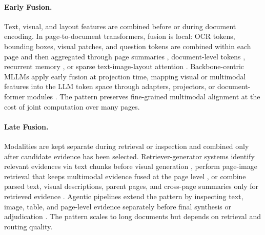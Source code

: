 \documentclass[11pt]{article}
\begin{document}
\paragraph{Early Fusion.}
Text, visual, and layout features are combined before or during document encoding. In page-to-document transformers, fusion is local: OCR tokens, bounding boxes, visual patches, and question tokens are combined within each page and then aggregated through page summaries \cite{tito2023hierarchical}, document-level tokens \cite{blau2024gram}, recurrent memory \cite{dong2024multi}, or sparse text-image-layout attention \cite{borchmann2025arctic}. Backbone-centric MLLMs apply early fusion at projection time, mapping visual or multimodal features into the LLM token space through adapters, projectors, or document-former modules \cite{tanaka2024instructdoc, duan2025docopilot, jia2024leopard}. The pattern preserves fine-grained multimodal alignment at the cost of joint computation over many pages.

\paragraph{Late Fusion.}
Modalities are kept separate during retrieval or inspection and combined only after candidate evidence has been selected. Retriever-generator systems identify relevant evidences via text chunks before visual generation \cite{zhang2024cream}, perform page-image retrieval that keeps multimodal evidence fused at the page level \cite{cho2024m3docrag}, or combine parsed text, visual descriptions, parent pages, and cross-page summaries only for retrieved evidence \cite{gong2025mhier}. Agentic pipelines extend the pattern by inspecting text, image, table, and page-level evidence separately before final synthesis or adjudication \cite{han2025mdocagent, duan2025m2rag, zhu2026doclens}. The pattern scales to long documents but depends on retrieval and routing quality.
\end{document}
